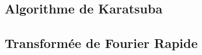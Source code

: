 \documentclass[a4paper]{report}
\begin{document}
      \paragraph{}
      	\subsection{Algorithme de Karatsuba} 
      	
      \paragraph{}  
    	\subsection{Transformée de Fourier Rapide} 
    	
      \paragraph{}
       
\end{document}
